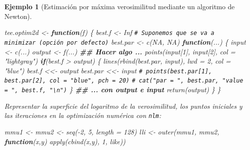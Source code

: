 \documentclass[
  10pt,
]{book}
\newenvironment{Shaded}{\begin{snugshade}}{\end{snugshade}}
\newcommand{\AttributeTok}[1]{\textcolor[rgb]{0.77,0.63,0.00}{#1}}
\newcommand{\CommentTok}[1]{\textcolor[rgb]{0.56,0.35,0.01}{\textit{#1}}}
\newcommand{\ConstantTok}[1]{\textcolor[rgb]{0.00,0.00,0.00}{#1}}
\newcommand{\ControlFlowTok}[1]{\textcolor[rgb]{0.13,0.29,0.53}{\textbf{#1}}}
\newcommand{\DecValTok}[1]{\textcolor[rgb]{0.00,0.00,0.81}{#1}}
\newcommand{\DocumentationTok}[1]{\textcolor[rgb]{0.56,0.35,0.01}{\textbf{\textit{#1}}}}
\newcommand{\FunctionTok}[1]{\textcolor[rgb]{0.00,0.00,0.00}{#1}}
\newcommand{\NormalTok}[1]{#1}
\newcommand{\OtherTok}[1]{\textcolor[rgb]{0.56,0.35,0.01}{#1}}
\newcommand{\SpecialCharTok}[1]{\textcolor[rgb]{0.00,0.00,0.00}{#1}}
\newcommand{\StringTok}[1]{\textcolor[rgb]{0.31,0.60,0.02}{#1}}
\theoremstyle{break}
\newtheorem{example}{Ejemplo}[chapter]
\theoremstyle{nonumberplain}
\renewcommand{\CommentTok}[1]{\textcolor[rgb]{0.41,0.41,0.41}{\texttt{#1}}}
\begin{document}
\begin{example}[Estimación por máxima verosimilitud mediante un algoritmo de Newton]
\begin{Shaded}
\begin{Highlighting}[]
\NormalTok{tee.optim2d }\OtherTok{\textless{}{-}} \ControlFlowTok{function}\NormalTok{(f) \{}
\NormalTok{  best.f }\OtherTok{\textless{}{-}} \ConstantTok{Inf}   \CommentTok{\# Suponemos que se va a minimizar (opción por defecto)}
\NormalTok{  best.par }\OtherTok{\textless{}{-}} \FunctionTok{c}\NormalTok{(}\ConstantTok{NA}\NormalTok{, }\ConstantTok{NA}\NormalTok{)   }
  \ControlFlowTok{function}\NormalTok{(...) \{}
\NormalTok{    input }\OtherTok{\textless{}{-}} \FunctionTok{c}\NormalTok{(...)}
\NormalTok{    output }\OtherTok{\textless{}{-}} \FunctionTok{f}\NormalTok{(...)}
    \DocumentationTok{\#\# Hacer algo ...}
    \FunctionTok{points}\NormalTok{(input[}\DecValTok{1}\NormalTok{], input[}\DecValTok{2}\NormalTok{], }\AttributeTok{col =} \StringTok{"lightgray"}\NormalTok{)}
    \ControlFlowTok{if}\NormalTok{(best.f }\SpecialCharTok{\textgreater{}}\NormalTok{ output) \{}
      \FunctionTok{lines}\NormalTok{(}\FunctionTok{rbind}\NormalTok{(best.par, input), }\AttributeTok{lwd =} \DecValTok{2}\NormalTok{, }\AttributeTok{col =} \StringTok{"blue"}\NormalTok{)}
\NormalTok{      best.f }\OtherTok{\textless{}\textless{}{-}}\NormalTok{ output}
\NormalTok{      best.par }\OtherTok{\textless{}\textless{}{-}}\NormalTok{ input}
      \CommentTok{\# points(best.par[1], best.par[2], col = "blue", pch = 20)}
      \CommentTok{\# cat("par = ", best.par, "value = ", best.f, "\textbackslash{}n")}
\NormalTok{    \} }
    \DocumentationTok{\#\# ... con output e input}
    \FunctionTok{return}\NormalTok{(output)}
\NormalTok{  \}}
\NormalTok{\}}
\end{Highlighting}
\end{Shaded}

Representar la superficie del logaritmo de la verosimilitud,
los puntos iniciales y las iteraciones en la optimización numérica con \texttt{nlm}:

\begin{Shaded}
\begin{Highlighting}[]
\NormalTok{mmu1 }\OtherTok{\textless{}{-}}\NormalTok{ mmu2 }\OtherTok{\textless{}{-}} \FunctionTok{seq}\NormalTok{(}\SpecialCharTok{{-}}\DecValTok{2}\NormalTok{, }\DecValTok{5}\NormalTok{, }\AttributeTok{length =} \DecValTok{128}\NormalTok{)}
\NormalTok{lli }\OtherTok{\textless{}{-}} \FunctionTok{outer}\NormalTok{(mmu1, mmu2, }\ControlFlowTok{function}\NormalTok{(x,y) }\FunctionTok{apply}\NormalTok{(}\FunctionTok{cbind}\NormalTok{(x,y), }\DecValTok{1}\NormalTok{, like))}


\end{Highlighting}
\end{Shaded}
\end{example}
\end{document}
